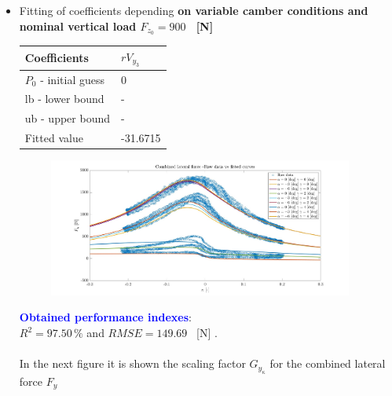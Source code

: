 \documentclass{IEEEtran}
\begin{document}
\begin{itemize}
            
            
            \item Fitting of coefficients depending \textbf{on variable camber conditions and nominal vertical load $F_{z_0} = 900 $ \, [N]}\\
            
            \begin{table}[!h]
                \begin{center}
                    \begin{tabular}{|l|l|}
                    \hline
                    Coefficients       & $rV_{y_3}$\\
                    \hline
                    $P_0$ - initial guess & 0 \\ \hline
                    lb - lower bound   & - \\ \hline
                    ub - upper bound   & - \\ \hline
                    Fitted value  & -31.6715 \\ \hline
                    \end{tabular}
                \end{center}
            \end{table} 
            
        
         \begin{figure}[!h]
                \centerline{\includegraphics[width = 3.95in]{combined_lateral_4.jpg}}
                
                \label{fig:COMB_lat_varGamma}
            \end{figure}
            

        \textbf{\textcolor{blue}{Obtained performance indexes}}: \\ $R^{2} = 97.50 \, \%$ and $RMSE = 149.69 $ \, [N] . \\\\

        In the next figure it is shown the scaling factor $G_{y_\kappa}$  for the combined lateral force $F_y$
        

\end{itemize}
\end{document}
